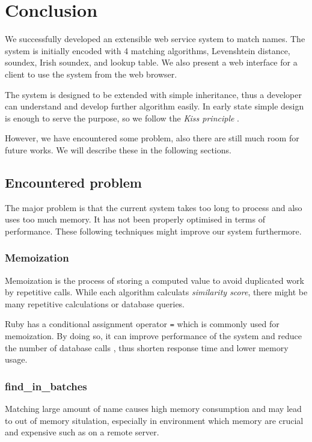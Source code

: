 \chapter{Conclusion}
\label{ch:conclusion}

We successfully developed an extensible web service system to match names.
The system is initially encoded with 4 matching algorithms,
Levenshtein distance, soundex, Irish soundex, and lookup table.
We also present a web interface for a client to use the system
from the web browser.

The system is designed to be extended with simple inheritance, thus a developer
can understand and develop further algorithm easily. In early state
simple design is enough to serve the purpose, so we follow the
\emph{Kiss principle} \cite[]{kiss}.

However, we have encountered some problem, also there are still much room
for future works. We will describe these in the following sections.

\section{Encountered problem}

The major problem is that the current system takes too long to process
and also uses too much memory. It has not been properly optimised
in terms of performance. These following techniques might improve
our system furthermore.

\subsection{Memoization}

Memoization is the process of storing a computed value to avoid
duplicated work by repetitive calls. While each algorithm calculats
\emph{similarity score}, there might be many repetitive calculations
or database queries.

Ruby has a conditional assignment operator \texttt{\textbar \textbar =} \cite[]{cao}
which is commonly used for memoization. By doing so, it can improve
performance of the system and reduce the number of database calls \cite[]{memoization},
thus shorten response time and lower memory usage.

\subsection{find\_in\_batches}
Matching large amount of name causes high memory consumption and may lead to
out of memory situlation, especially in environment which memory are crucial
and expensive such as on a remote server.

